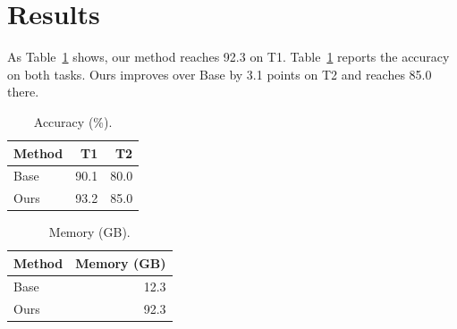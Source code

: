 \documentclass{article}\usepackage{booktabs}
\begin{document}
\section{Results}
As Table~\ref{tab:acc} shows, our method reaches 92.3 on T1.
Table~\ref{tab:acc} reports the accuracy on both tasks. Ours improves over Base by 3.1 points on T2 and reaches 85.0 there.
\begin{table}[h]\centering\caption{Accuracy (\%).}\label{tab:acc}
\begin{tabular}{lrr}
\toprule
Method & T1 & T2 \\
\midrule
Base & 90.1 & 80.0 \\
Ours & 93.2 & 85.0 \\
\bottomrule
\end{tabular}\end{table}
\begin{table}[h]\centering\caption{Memory (GB).}\label{tab:mem}
\begin{tabular}{lr}
\toprule
Method & Memory (GB) \\
\midrule
Base & 12.3 \\
Ours & 92.3 \\
\bottomrule
\end{tabular}\end{table}
\end{document}
